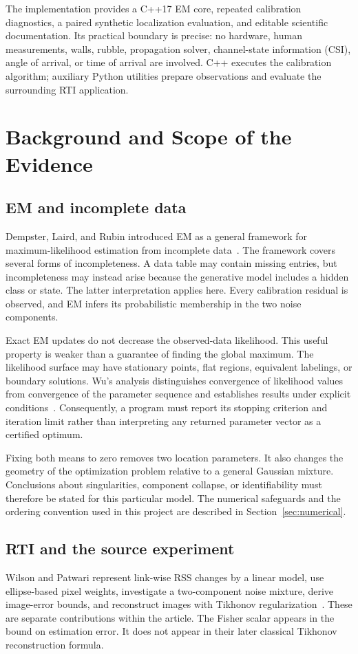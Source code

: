 \documentclass[conference,letterpaper]{IEEEtran}
\begin{document}
The implementation provides a C++17 EM core, repeated calibration diagnostics, a paired synthetic localization evaluation, and editable scientific documentation. Its practical boundary is precise: no hardware, human measurements, walls, rubble, propagation solver, channel-state information (CSI), angle of arrival, or time of arrival are involved. C++ executes the calibration algorithm; auxiliary Python utilities prepare observations and evaluate the surrounding RTI application.

\section{Background and Scope of the Evidence}
\subsection{EM and incomplete data}
Dempster, Laird, and Rubin introduced EM as a general framework for maximum-likelihood estimation from incomplete data~\cite{dempster1977}. The framework covers several forms of incompleteness. A data table may contain missing entries, but incompleteness may instead arise because the generative model includes a hidden class or state. The latter interpretation applies here. Every calibration residual is observed, and EM infers its probabilistic membership in the two noise components.

Exact EM updates do not decrease the observed-data likelihood. This useful property is weaker than a guarantee of finding the global maximum. The likelihood surface may have stationary points, flat regions, equivalent labelings, or boundary solutions. Wu's analysis distinguishes convergence of likelihood values from convergence of the parameter sequence and establishes results under explicit conditions~\cite{wu1983}. Consequently, a program must report its stopping criterion and iteration limit rather than interpreting any returned parameter vector as a certified optimum.

Fixing both means to zero removes two location parameters. It also changes the geometry of the optimization problem relative to a general Gaussian mixture. Conclusions about singularities, component collapse, or identifiability must therefore be stated for this particular model. The numerical safeguards and the ordering convention used in this project are described in Section~\ref{sec:numerical}.

\subsection{RTI and the source experiment}
Wilson and Patwari represent link-wise RSS changes by a linear model, use ellipse-based pixel weights, investigate a two-component noise mixture, derive image-error bounds, and reconstruct images with Tikhonov regularization~\cite{wilson2010}. These are separate contributions within the article. The Fisher scalar appears in the bound on estimation error. It does not appear in their later classical Tikhonov reconstruction formula.
\end{document}
